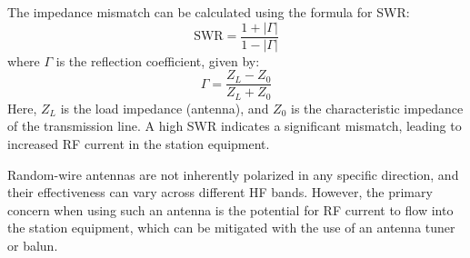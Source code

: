 The impedance mismatch can be calculated using the formula for SWR:
\[
\text{SWR} = \frac{1 + |\Gamma|}{1 - |\Gamma|}
\]
where \(\Gamma\) is the reflection coefficient, given by:
\[
\Gamma = \frac{Z_L - Z_0}{Z_L + Z_0}
\]
Here, \(Z_L\) is the load impedance (antenna), and \(Z_0\) is the characteristic impedance of the transmission line. A high SWR indicates a significant mismatch, leading to increased RF current in the station equipment.

Random-wire antennas are not inherently polarized in any specific direction, and their effectiveness can vary across different HF bands. However, the primary concern when using such an antenna is the potential for RF current to flow into the station equipment, which can be mitigated with the use of an antenna tuner or balun.

